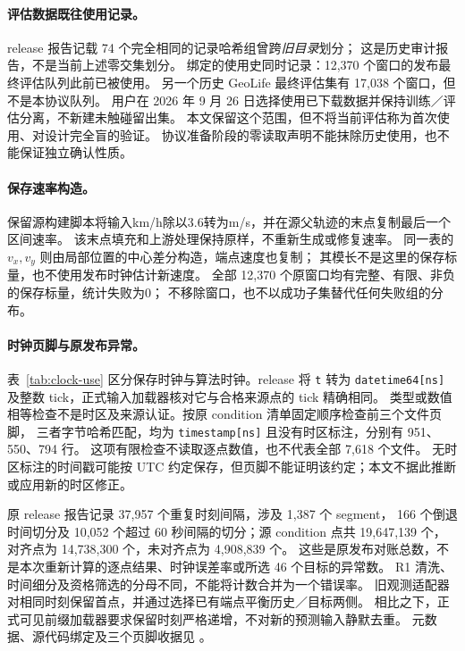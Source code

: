 \documentclass[UTF8,11pt]{ctexart}
\begin{document}
\paragraph{评估数据既往使用记录。}
release 报告记载 74 个完全相同的记录哈希组曾跨\emph{旧目录}划分；
这是历史审计报告，不是当前上述零交集划分。
绑定的使用史同时记录：12,370 个窗口的发布最终评估队列此前已被使用。
另一个历史 GeoLife 最终评估集有 17,038 个窗口，但不是本协议队列。
用户在 2026 年 9 月 26 日选择使用已下载数据并保持训练／评估分离，不新建未触碰留出集。
本文保留这个范围，但不将当前评估称为首次使用、对设计完全盲的验证。
协议准备阶段的零读取声明不能抹除历史使用，也不能保证独立确认性质。

\paragraph{保存速率构造。}
保留源构建脚本将输入km/h除以3.6转为m/s，并在源父轨迹的末点复制最后一个区间速率。
该末点填充和上游处理保持原样，不重新生成或修复速率。
同一表的 $v_x,v_y$ 则由局部位置的中心差分构造，端点速度也复制；
其模长不是这里的保存标量，也不使用发布时钟估计新速度。
全部 12,370 个原窗口均有完整、有限、非负的保存标量，统计失败为0；
不移除窗口，也不以成功子集替代任何失败组的分布。

\paragraph{时钟页脚与原发布异常。}
表~\ref{tab:clock-use} 区分保存时钟与算法时钟。release 将 \texttt{t} 转为
\texttt{datetime64[ns]} 及整数 tick，正式输入加载器核对它与合格来源点的 tick 精确相同。
类型或数值相等检查不是时区及来源认证。按原 condition 清单固定顺序检查前三个文件页脚，
三者字节哈希匹配，均为 \texttt{timestamp[ns]} 且没有时区标注，分别有 951、550、794 行。
这项有限检查不读取逐点数值，也不代表全部 7,618 个文件。
无时区标注的时间戳可能按 UTC 约定保存，但页脚不能证明该约定；本文不据此推断或应用新的时区修正。

原 release 报告记录 37,957 个重复时刻间隔，涉及 1,387 个 segment，
166 个倒退时间切分及 10,052 个超过 60 秒间隔的切分；源 condition 点共 19,647,139 个，
对齐点为 14,738,300 个，未对齐点为 4,908,839 个。
这些是原发布对账总数，不是本次重新计算的逐点结果、时钟误差率或所选 46 个目标的异常数。
R1 清洗、时间细分及资格筛选的分母不同，不能将计数合并为一个错误率。
旧观测适配器 对相同时刻保留首点，并通过选择已有端点平衡历史／目标两侧。
相比之下，正式可见前缀加载器要求保留时刻严格递增，不对新的预测输入静默去重。
元数据、源代码绑定及三个页脚收据见 。
\end{document}
